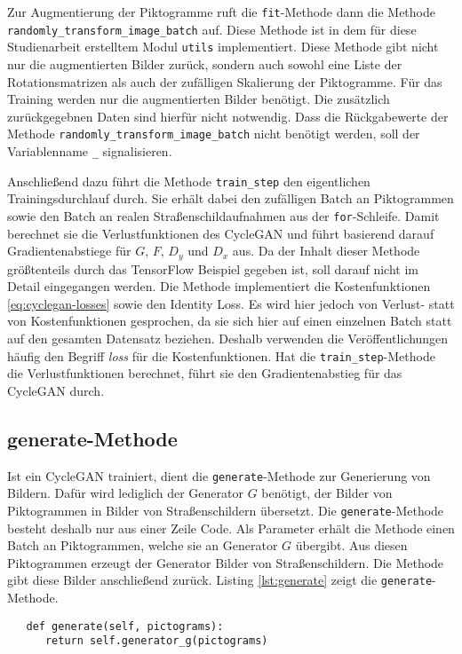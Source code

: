 Zur Augmentierung der Piktogramme ruft die \texttt{fit}-Methode dann die Methode \texttt{randomly_transform_image_batch} auf. Diese Methode ist in dem für diese Studienarbeit erstelltem Modul \texttt{utils} implementiert. Diese Methode gibt nicht nur die augmentierten Bilder zurück, sondern auch sowohl eine Liste der Rotationsmatrizen als auch der zufälligen Skalierung der Piktogramme. Für das Training werden nur die augmentierten Bilder benötigt. Die zusätzlich zurückgegebnen Daten sind hierfür nicht notwendig. Dass die Rückgabewerte der Methode \texttt{randomly_transform_image_batch} nicht benötigt werden, soll der Variablenname \texttt{_} signalisieren.

Anschließend dazu führt die Methode \texttt{train_step} den eigentlichen Trainingsdurchlauf durch. Sie erhält dabei den zufälligen Batch an Piktogrammen sowie den Batch an realen Straßenschildaufnahmen aus der \texttt{for}-Schleife. Damit berechnet sie die Verlustfunktionen des \ac{CycleGAN} und führt basierend darauf Gradientenabstiege für $G$, $F$, $D_y$ und $D_x$ aus. Da der Inhalt dieser Methode größtenteils durch das TensorFlow Beispiel gegeben ist, soll darauf nicht im Detail eingegangen werden. Die Methode implementiert die Kostenfunktionen \ref{eq:cyclegan-losses} sowie den Identity Loss. Es wird hier jedoch von Verlust- statt von Kostenfunktionen gesprochen, da sie sich hier auf einen einzelnen Batch statt auf den gesamten Datensatz beziehen. Deshalb verwenden die Veröffentlichungen häufig den Begriff \emph{loss} für die Kostenfunktionen. Hat die \texttt{train_step}-Methode die Verlustfunktionen berechnet, führt sie den Gradientenabstieg für das \ac{CycleGAN} durch.

\subsection{generate-Methode}
Ist ein \ac{CycleGAN} trainiert, dient die \texttt{generate}-Methode zur Generierung von Bildern. Dafür wird lediglich der Generator $G$ benötigt, der Bilder von Piktogrammen in Bilder von Straßenschildern übersetzt. Die \texttt{generate}-Methode besteht deshalb nur aus einer Zeile Code. Als Parameter erhält die Methode einen Batch an Piktogrammen, welche sie an Generator $G$ übergibt. Aus diesen Piktogrammen erzeugt der Generator Bilder von Straßenschildern. Die Methode gibt diese Bilder anschließend zurück. Listing \ref{lst:generate} zeigt die \texttt{generate}-Methode.

\begin{code}
   \begin{verbatim}
   def generate(self, pictograms):
      return self.generator_g(pictograms)
   \end{verbatim}
   \label{lst:generate}
\end{code}